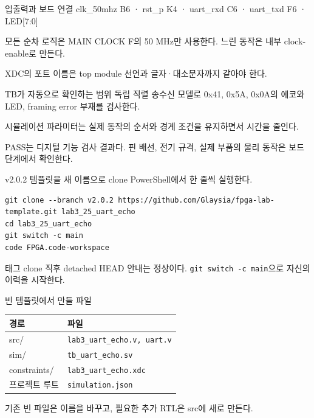 \begin{frame}{입출력과 보드 연결}
\small
clk\_50mhz B6 · rst\_p K4 · uart\_rxd C6 · uart\_txd F6 · LED[7:0]\par\vspace{0.32cm}
모든 순차 로직은 MAIN CLOCK F의 50 MHz만 사용한다. 느린 동작은 내부 clock-enable로 만든다.\par\vspace{0.28cm}
XDC의 포트 이름은 top module 선언과 글자·대소문자까지 같아야 한다.
\end{frame}

\begin{frame}{TB가 자동으로 확인하는 범위}
\small
독립 직렬 송수신 모델로 0x41, 0x5A, 0x0A의 에코와 LED, framing error 부재를 검사한다.\par\vspace{0.28cm}
시뮬레이션 파라미터는 실제 동작의 순서와 경계 조건을 유지하면서 시간을 줄인다.\par\vspace{0.28cm}
PASS는 디지털 기능 검사 결과다. 핀 배선, 전기 규격, 실제 부품의 물리 동작은 보드 단계에서 확인한다.
\end{frame}

\begin{frame}[fragile,label=start]{v2.0.2 템플릿을 새 이름으로 clone}
\small
PowerShell에서 한 줄씩 실행한다.
\begin{lstlisting}[language={}]
git clone --branch v2.0.2 https://github.com/Glaysia/fpga-lab-template.git lab3_25_uart_echo
cd lab3_25_uart_echo
git switch -c main
code FPGA.code-workspace
\end{lstlisting}
태그 clone 직후 detached HEAD 안내는 정상이다. \texttt{git switch -c main}으로 자신의 이력을 시작한다.
\end{frame}

\begin{frame}{빈 템플릿에서 만들 파일}
\small
\begin{center}\renewcommand{\arraystretch}{1.35}\begin{tabular}{>{\raggedright\arraybackslash}p{2.25cm}p{7.2cm}}
경로 & 파일\\\hline
src/ & \texttt{lab3\_uart\_echo.v, uart.v}\\
sim/ & \texttt{tb\_uart\_echo.sv}\\
constraints/ & \texttt{lab3\_uart\_echo.xdc}\\
프로젝트 루트 & \texttt{simulation.json}\\
\end{tabular}\end{center}
기존 빈 파일은 이름을 바꾸고, 필요한 추가 RTL은 src에 새로 만든다.
\end{frame}

